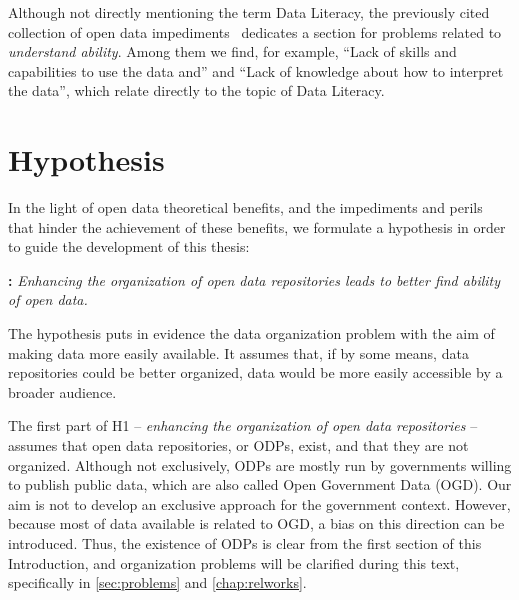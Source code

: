 {Although not directly mentioning  the term Data Literacy, the previously cited collection of open data impediments~\cite{Zuiderwijk2012} dedicates a section for problems related to \emph{understand ability}.
Among them we find, for example, ``Lack of skills and capabilities to use the data and'' and ``Lack of knowledge about how to interpret the data'', which relate directly to the topic of Data Literacy.

\section{Hypothesis}

In the light of open data theoretical benefits, and the impediments and perils that hinder the achievement of these benefits, we formulate a hypothesis in order to guide the development of this thesis:



\noindent\textbf{:} \emph{Enhancing the organization of open data repositories leads to better find ability of open data.}


The hypothesis puts in evidence the data organization problem with the aim of making data more easily available.
It assumes that, if by some means, data repositories could be better organized, data would be more easily accessible by a broader audience.

The first part of H1 -- \emph{enhancing the organization of open data repositories} -- assumes that open data repositories, or ODPs, exist, and that they are not organized.
Although not exclusively, ODPs are mostly run by governments willing to publish public data, which are also called Open Government Data (OGD).
Our aim is not to develop an exclusive approach for the government context.
However, because most of data available is related to OGD, a bias on this direction can be introduced.
Thus, the existence of ODPs is clear from the first section of this Introduction, and organization problems will be clarified during this text, specifically in \autoref{sec:problems} and \autoref{chap:relworks}.

}
